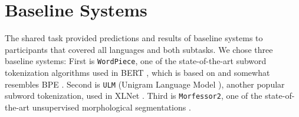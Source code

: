 \documentclass[11pt]{article}
\begin{document}
\section{Baseline Systems}
The shared task provided predictions and results of baseline systems to participants that covered all languages and both subtasks. We chose three baseline systems: 
First is \texttt{WordPiece},  one of the state-of-the-art subword tokenization algorithms used in BERT \cite{devlin-etal-2019-bert}, which is based on \citet{schuster2012japanese} and somewhat resembles BPE \cite{sennrich2016neural}. Second is \texttt{ULM} (Unigram Language Model \citet{kudo-2018-subword}), another popular subword tokenization, used in XLNet \cite{yang2019xlnet}. Third is \texttt{Morfessor2}, one of the state-of-the-art unsupervised morphological segmentations \cite{virpioja2013morfessor}. 
\end{document}
